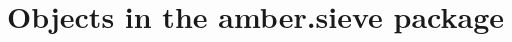 \section{Objects in the amber.sieve package}




\begin{classmetadata}
\end{classmetadata}

\begin{interface}
\end{interface}

